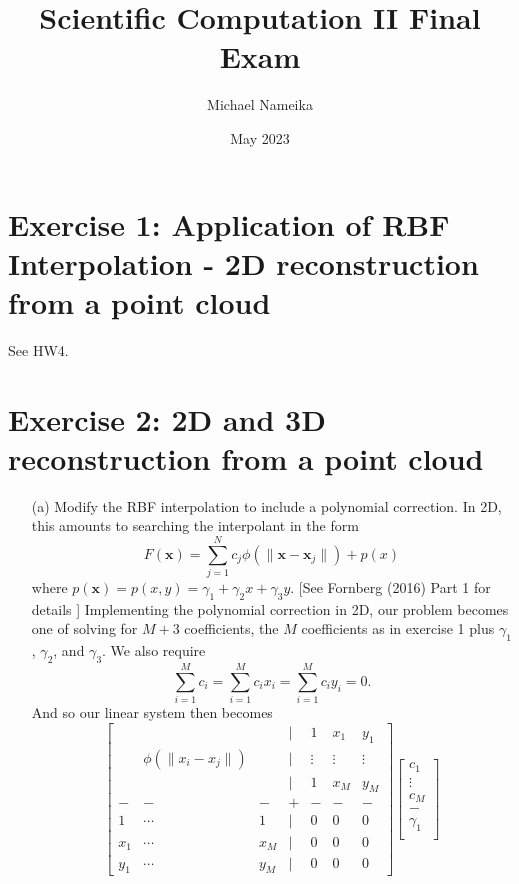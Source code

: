\documentclass{article}
\title{Scientific Computation II Final Exam}
\author{Michael Nameika}
\date{May 2023}
\begin{document}
\maketitle

\section*{Exercise 1: Application of RBF Interpolation - 2D reconstruction from a point cloud}
See HW4.

\section*{Exercise 2: 2D and 3D reconstruction from a point cloud}
\begin{itemize}
    \item[(a)] Modify the RBF interpolation to include a polynomial correction. In 2D, this amounts to searching the interpolant in the form
    \[F(\mathbf{x}) = \sum_{j = 1}^N c_j\phi(\|\mathbf{x} - \mathbf{x}_j\|) + p(x)\]
    where $p(\mathbf{x}) = p(x,y) = \gamma_1 + \gamma_2x + \gamma_3y$. [See Fornberg (2016) Part 1 for details ]
    \newline\newline
    Implementing the polynomial correction in 2D, our problem becomes one of solving for $M + 3$ coefficients, the $M$ coefficients as in exercise 1 plus $\gamma_1$, $\gamma_2$, and $\gamma_3$. We also require 
    \[\sum_{i = 1}^M c_i = \sum_{i=1}^M c_ix_i = \sum_{i=1}^M c_iy_i = 0.\]
    And so our linear system then becomes
    \[\begin{bmatrix}
         & & & | & 1 & x_1 & y_1\\
         & \phi(\|x_i - x_j\|) & & | & \vdots & \vdots & \vdots\\
         & & & | & 1 & x_M & y_M\\
         - & - & - & + & - & - & -\\
         1 & \cdots & 1 & | & 0 & 0 & 0\\
         x_1 & \cdots & x_M & | & 0 & 0 & 0\\
         y_1 & \cdots & y_M & | & 0 & 0 & 0
    \end{bmatrix}\begin{bmatrix}
        c_1\\
        \vdots\\
        c_M\\
        -\\
        \gamma_1\\

\end{bmatrix}\]
\end{itemize}
\end{document}
